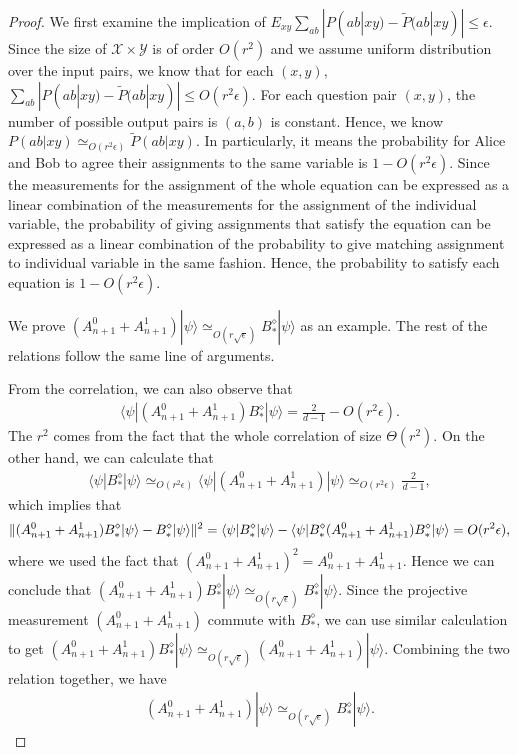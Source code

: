 \documentclass[11pt,letterpaper]{article}
\newcommand{\ket}[1]{|#1\rangle}
\newcommand{\bra}[1]{\langle#1|}
\DeclarePairedDelimiter{\norm}{\lVert}{\rVert}
\newcommand{\calX}{\mathcal{X}}
\newcommand{\calY}{\mathcal{Y}}
\newcommand{\1}{\mathbb{1}}
\newcommand{\pr}[2]{P(#1|#2)}
\newcommand{\tpr}[2]{\tilde{P}(#1|#2)}
\newcommand{\ep}{\epsilon}
\newcommand{\se}{\sqrt{\epsilon}}
\newcommand{\appd}[1]{\simeq_{#1}}
\theoremstyle{definition}
\begin{document}
\begin{proof} 
We first examine the implication of $E_{xy} \sum_{ab} |\pr{ab}{xy} - \tpr{ab}{xy}| \leq \ep$.
Since the size of $\calX \times \calY$ is of order $O(r^2)$ and we assume uniform distribution over the input pairs,
we know that for each $(x,y)$, $\sum_{ab} |\pr{ab}{xy} - \tpr{ab}{xy}| \leq O(r^2 \epsilon)$.
For each question pair $(x,y)$, the number of possible output pairs is $(a,b)$ is constant.
Hence, we know $\pr{ab}{xy} \appd{O(r^2\ep)} \tpr{ab}{xy}$. In particularly, it means the probability for Alice and Bob to agree
their assignments to the same variable is $1 - O(r^2 \ep)$. 
Since the measurements for the assignment of the whole equation can be
expressed as a linear combination of the measurements for the assignment of the individual variable, 
the probability of giving assignments
that satisfy the equation can be expressed as a linear combination of the probability to give matching assignment 
to individual variable in the same fashion. Hence, the probability to satisfy each equation is $1 -O(r^2 \ep)$.

We prove $(A_{n+1}^0+A_{n+1}^1)\ket{\psi} \appd{O(r\se)} B_\ast^\diamond \ket{\psi}$ as an example.
The rest of the relations follow the same line of arguments.

From the correlation, we can also observe that
\begin{align}
 \bra{\psi} (A_{n+1}^0+A_{n+1}^1)B_\ast^\diamond \ket{\psi} = \frac{2}{d-1} - O(r^2 \epsilon).
\end{align}
The $r^2$ comes from the fact that the whole correlation of size $\Theta(r^2)$.
On the other hand, we can calculate that 
\begin{align}
	\bra{\psi} B_\ast^\diamond \ket{\psi} \appd{O(r^2\epsilon)} 
 \bra{\psi}(A_{n+1}^0+A_{n+1}^1)\ket{\psi} \appd{O(r^2\epsilon)} \frac{2}{d-1},
\end{align}
which implies that 
\begin{align}
	\norm{(A_{n+1}^0 + A_{n+1}^1)B_\ast^\diamond \ket{\psi} - B_\ast^\diamond\ket{\psi}}^2 
	= \bra{\psi} B_\ast^\diamond \ket{\psi} - \bra{\psi}B_\ast^\diamond(A_{n+1}^0 + A_{n+1}^1)B_\ast^\diamond \ket{\psi}
	= O(r^2 \epsilon),
\end{align}
where we used the fact that $(A_{n+1}^0 + A_{n+1}^1)^2 = A_{n+1}^0 + A_{n+1}^1$.
Hence we can conclude that $(A_{n+1}^0 + A_{n+1}^1)B_\ast^\diamond \ket{\psi} \appd{O(r\se)} B_\ast^\diamond\ket{\psi}$.
Since the projective measurement $(A_{n+1}^0+A_{n+1}^1)$ commute with $B_\ast^\diamond$, we can use similar calculation to get
$(A_{n+1}^0 + A_{n+1}^1)B_\ast^\diamond \ket{\psi} \appd{O(r\se)} (A_{n+1}^0 + A_{n+1}^1)\ket{\psi}$.
Combining the two relation together, we have
\begin{align}
	(A_{n+1}^0 + A_{n+1}^1) \ket{\psi} \appd{O(r\se)} B_\ast^\diamond \ket{\psi}.
\end{align}


\end{proof}
\end{document}
